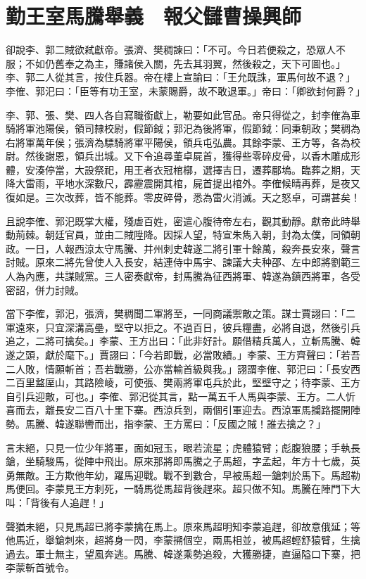 
\chapter{勤王室馬騰舉義　報父讎曹操興師}

卻說李、郭二賊欲弒獻帝。張濟、樊稠諫曰：「不可。今日若便殺之，恐眾人不服；不如仍舊奉之為主，賺諸侯入關，先去其羽翼，然後殺之，天下可圖也。」李、郭二人從其言，按住兵器。帝在樓上宣諭曰：「王允既誅，軍馬何故不退？」李傕、郭汜曰：「臣等有功王室，未蒙賜爵，故不敢退軍。」帝曰：「卿欲封何爵？」

李、郭、張、樊、四人各自寫職銜獻上，勒要如此官品。帝只得從之，封李傕為車騎將軍池陽侯，領司隸校尉，假節鉞；郭汜為後將軍，假節鉞：同秉朝政；樊稠為右將軍萬年侯；張濟為驃騎將軍平陽侯，領兵屯弘農。其餘李蒙、王方等，各為校尉。然後謝恩，領兵出城。又下令追尋董卓屍首，獲得些零碎皮骨，以香木雕成形體，安湊停當，大設祭祀，用王者衣冠棺槨，選擇吉日，遷葬郿塢。臨葬之期，天降大雷雨，平地水深數尺，霹靂震開其棺，屍首提出棺外。李傕候晴再葬，是夜又復如是。三次改葬，皆不能葬。零皮碎骨，悉為雷火消滅。天之怒卓，可謂甚矣！

且說李傕、郭汜既掌大權，殘虐百姓，密遣心腹待帝左右，觀其動靜。獻帝此時舉動荊棘。朝廷官員，並由二賊陞降。因採人望，特宣朱雋入朝，封為太僕，同領朝政。一日，人報西涼太守馬騰、并州刺史韓遂二將引軍十餘萬，殺奔長安來，聲言討賊。原來二將先曾使人入長安，結連侍中馬宇、諫議大夫种邵、左中郎將劉範三人為內應，共謀賊黨。三人密奏獻帝，封馬騰為征西將軍、韓遂為鎮西將軍，各受密詔，併力討賊。

當下李傕，郭汜，張濟，樊稠聞二軍將至，一同商議禦敵之策。謀士賈詡曰：「二軍遠來，只宜深溝高壘，堅守以拒之。不過百日，彼兵糧盡，必將自退，然後引兵追之，二將可擒矣。」李蒙、王方出曰：「此非好計。願借精兵萬人，立斬馬騰、韓遂之頭，獻於麾下。」賈詡曰：「今若即戰，必當敗績。」李蒙、王方齊聲曰：「若吾二人敗，情願斬首；吾若戰勝，公亦當輸首級與我。」詡謂李傕、郭汜曰：「長安西二百里盩厔山，其路險崚，可使張、樊兩將軍屯兵於此，堅壁守之；待李蒙、王方自引兵迎敵，可也。」李傕、郭汜從其言，點一萬五千人馬與李蒙、王方。二人忻喜而去，離長安二百八十里下寨。西涼兵到，兩個引軍迎去。西涼軍馬攔路擺開陣勢。馬騰、韓遂聯轡而出，指李蒙、王方罵曰：「反國之賊！誰去擒之？」

言未絕，只見一位少年將軍，面如冠玉，眼若流星；虎體猿臂；彪腹狼腰；手執長鎗，坐騎駿馬，從陣中飛出。原來那將即馬騰之子馬超，字孟起，年方十七歲，英勇無敵。王方欺他年幼，躍馬迎戰。戰不到數合，早被馬超一鎗刺於馬下。馬超勒馬便回。李蒙見王方刺死，一騎馬從馬超背後趕來。超只做不知。馬騰在陣門下大叫：「背後有人追趕！」

聲猶未絕，只見馬超已將李蒙擒在馬上。原來馬超明知李蒙追趕，卻故意俄延；等他馬近，舉鎗刺來，超將身一閃，李蒙搠個空，兩馬相並，被馬超輕舒猿臂，生擒過去。軍士無主，望風奔逃。馬騰、韓遂乘勢追殺，大獲勝捷，直逼隘口下寨，把李蒙斬首號令。

